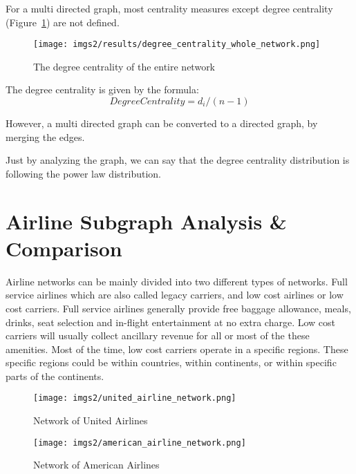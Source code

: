 \documentclass[twocolumn]{tum-article}
\begin{document}
For a multi directed graph, most centrality measures except degree centrality (Figure~\ref{fig:degree_centrality}) are not defined. 

\begin{figure}
        \centering
        \texttt{[image: imgs2/results/degree\_centrality\_whole\_network.png]}
        \caption{
The degree centrality of the entire network}
        \label{fig:degree_centrality}
\end{figure}

The degree centrality is given by the formula:
\begin{equation}
	Degree Centrality=d_i/(n-1)
\end{equation}

However, a multi directed graph can be converted to a directed graph, by merging the edges. 

Just by analyzing the graph, we can say that the degree centrality distribution is following the power law distribution.

\section{Airline Subgraph Analysis \& Comparison}

Airline networks can be mainly divided into two different types of networks. Full service airlines which are also called legacy carriers, and low cost airlines or low cost carriers.  
Full service airlines generally provide free baggage allowance, meals, drinks, seat selection and in-flight entertainment at no extra charge.
Low cost carriers will usually collect ancillary revenue for all or most of the these amenities.
Most of the time, low cost carriers operate in a specific regions.
These specific regions could be within countries, within continents, or within specific parts of the continents.

\begin{figure}
        \centering
        \texttt{[image: imgs2/united\_airline\_network.png]}
        \caption{
Network of United Airlines}
        \label{fig:united_airline}
\end{figure}

\begin{figure}
        \centering
        \texttt{[image: imgs2/american\_airline\_network.png]}
        \caption{
Network of American Airlines}
        \label{fig:american_airline}
\end{figure}
\end{document}
